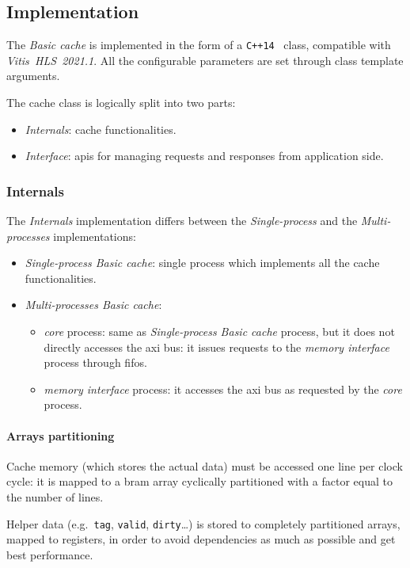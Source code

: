 \documentclass[11pt,a4paper,oneside]{memoir}
\begin{document}
\subsection{Implementation}
The \emph{Basic cache} is implemented in the form of a
\texttt{C++14}~\cite{cpp14} class, compatible with
\emph{Vitis\texttrademark~HLS~2021.1}.
All the configurable parameters are set through class template arguments.

The cache class is logically split into two parts:
\begin{itemize}
	\item \emph{Internals}: cache functionalities.
	\item \emph{Interface}: \acsp{api} for managing requests and responses
		from application side.
\end{itemize}

\subsubsection{Internals}
The \emph{Internals} implementation differs between the \emph{Single-process}
and the \emph{Multi-processes} implementations:
\begin{itemize}
	\item \emph{Single-process Basic cache}: single process which
		implements all the cache functionalities.
	\item \emph{Multi-processes Basic cache}:
		\begin{itemize}
			\item \emph{core} process: same as \emph{Single-process
				Basic cache} process, but it does not
				directly accesses the \ac{axi} bus: it issues
				requests to the \emph{memory interface} process
				through \acp{fifo}.
			\item \emph{memory interface} process: it accesses the
				\ac{axi} bus as requested by the \emph{core}
				process.
		\end{itemize}
\end{itemize}

\paragraph{Arrays partitioning}
Cache memory (which stores the actual data) must be accessed one line per clock
cycle: it is mapped to a \ac{bram} array cyclically partitioned with a factor
equal to the number of lines.

Helper data (e.g.\ \texttt{tag}, \texttt{valid}, \texttt{dirty}\ldots) is stored
to completely partitioned arrays, mapped to registers, in order to avoid
dependencies as much as possible and get best performance.
\end{document}
